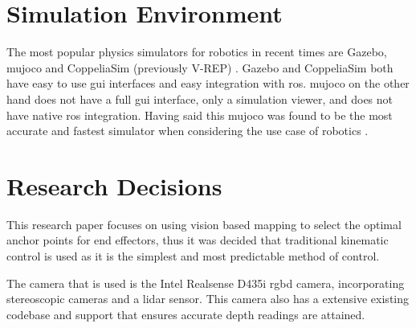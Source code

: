 



\section{Simulation Environment}

The most popular physics simulators for robotics in recent times are Gazebo, \ac{mujoco} and CoppeliaSim (previously V-REP) \citep{Collins-2021}. Gazebo and CoppeliaSim both have easy to use \ac{gui} interfaces and easy integration with \ac{ros}. \ac{mujoco} on the other hand does not have a full \ac{gui} interface, only a simulation viewer, and does not have native \ac{ros} integration. Having said this \ac{mujoco} was found to be the most accurate and fastest simulator when considering the use case of robotics \citep{Erez-2015}.

\section{Research Decisions}
This research paper focuses on using vision based mapping to select the optimal anchor points for end effectors, thus it was decided that traditional kinematic control is used as it is the simplest and most predictable method of control.

The camera that is used is the Intel Realsense D435i \ac{rgbd} camera, incorporating stereoscopic cameras and a \ac{lidar} sensor. This camera also has a extensive existing codebase and support that ensures accurate depth readings are attained.

